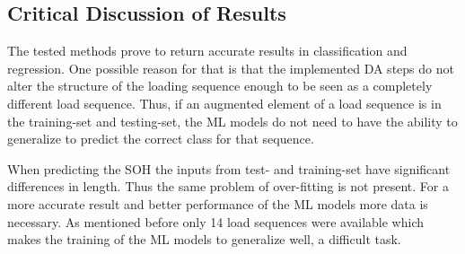 \subsection{Critical Discussion of Results}

The tested methods prove to return accurate results in classification and regression. One possible reason for that is that the implemented DA steps do not alter the structure of the loading sequence enough to be seen as a completely different load sequence. Thus, if an augmented element of a load sequence is in the training-set and testing-set, the ML models do not need to have the ability to generalize to predict the correct class for that sequence. 

When predicting the SOH the inputs from test- and training-set have significant differences in length. Thus the same problem of over-fitting is not present. For a more accurate result and better performance of the ML models more data is necessary. As mentioned before only 14 load sequences were available which makes the training of the ML models to generalize well, a difficult task.   

